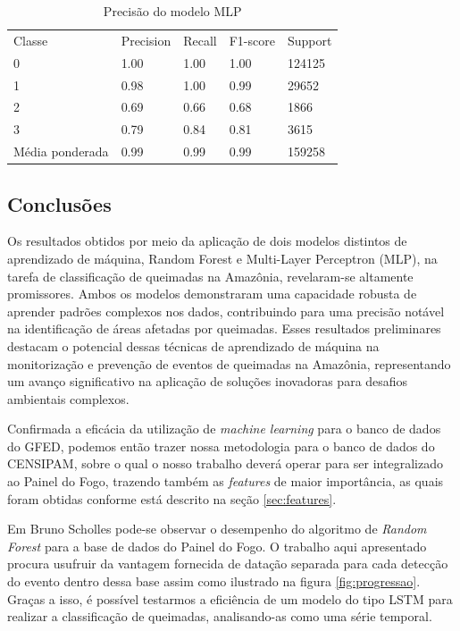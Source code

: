 \begin{table}[H]
\centering
\caption{Precisão do modelo MLP}
\label{tab:mlp}
\begin{tabular}{lllll}
Classe          & Precision & Recall & F1-score & Support \\
0               & 1.00      & 1.00   & 1.00     & 124125  \\
1               & 0.98      & 1.00   & 0.99     & 29652   \\
2               & 0.69      & 0.66   & 0.68     & 1866    \\
3               & 0.79      & 0.84   & 0.81     & 3615    \\ \cline{1-1}
Média ponderada & 0.99      & 0.99   & 0.99     & 159258 
\end{tabular}
\end{table}

\subsection{Conclusões}

Os resultados obtidos por meio da aplicação de dois modelos distintos de aprendizado de máquina, Random Forest e Multi-Layer Perceptron (MLP), na tarefa de classificação de queimadas na Amazônia, revelaram-se altamente promissores. Ambos os modelos demonstraram uma capacidade robusta de aprender padrões complexos nos dados, contribuindo para uma precisão notável na identificação de áreas afetadas por queimadas. Esses resultados preliminares destacam o potencial dessas técnicas de aprendizado de máquina na monitorização e prevenção de eventos de queimadas na Amazônia, representando um avanço significativo na aplicação de soluções inovadoras para desafios ambientais complexos.

Confirmada a eficácia da utilização de \textit{machine learning} para o banco de dados do GFED, podemos então trazer nossa metodologia para o banco de dados do CENSIPAM, sobre o qual o nosso trabalho deverá operar para ser integralizado ao Painel do Fogo, trazendo também as \textit{features} de maior importância, as quais foram obtidas conforme está descrito na seção \ref{sec:features}.

Em Bruno Scholles \cite{BrunoScholess2023} pode-se observar o desempenho do algoritmo de \textit{Random Forest} para a base de dados do Painel do Fogo. O trabalho aqui apresentado procura usufruir da vantagem fornecida de datação separada para cada detecção do evento dentro dessa base assim como ilustrado na figura \ref{fig:progressao}. Graças a isso, é possível testarmos a eficiência de um modelo do tipo LSTM para realizar a classificação de queimadas, analisando-as como uma série temporal.



